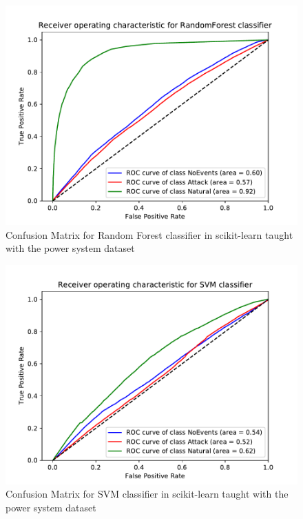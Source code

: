 \begin{figure}[t]
    \centering
    \includegraphics[page=2, width=180mm, trim= 0 50 0 100, clip]{images/results_scikit/RandomForest}
    \caption{Confusion Matrix for Random Forest classifier in scikit-learn taught with the power system dataset}
    \label{fig:scikit_RF_CM}
\end{figure}

\begin{figure}[t]
    \centering
    \includegraphics[page=2, width=180mm, trim= 0 50 0 100, clip]{images/results_scikit/SVM}
    \caption{Confusion Matrix for SVM classifier in scikit-learn taught with the power system dataset}
    \label{fig:scikit_SVM_CM}
\end{figure}

